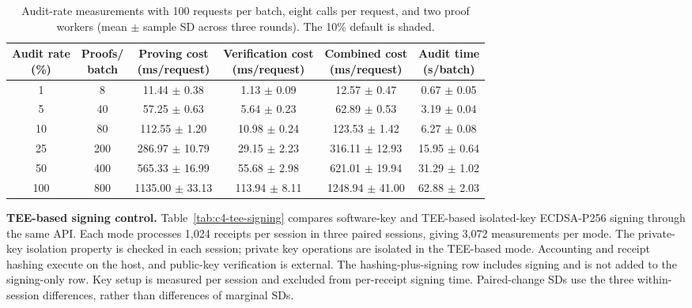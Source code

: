 \begin{table}[!t]
\centering
\caption{Audit-rate measurements with 100 requests per batch, eight calls per request, and two proof workers (mean $\pm$ sample SD across three rounds). The 10\% default is shaded.}
\label{tab:c3-audit-rate}
\footnotesize
\renewcommand{\arraystretch}{1.08}
\begin{tabular*}{\textwidth}{@{\hspace{3pt}}c@{\extracolsep{\fill}}ccccc@{\hspace{3pt}}}
\toprule
\shortstack{\textbf{Audit rate}\\\textbf{(\%)}} & \shortstack{\textbf{Proofs/}\\\textbf{batch}} & \shortstack{\textbf{Proving cost}\\\textbf{(ms/request)}} & \shortstack{\textbf{Verification cost}\\\textbf{(ms/request)}} & \shortstack{\textbf{Combined cost}\\\textbf{(ms/request)}} & \shortstack{\textbf{Audit time}\\\textbf{(s/batch)}} \\
\midrule
1 & 8 & 11.44 $\pm$ 0.38 & 1.13 $\pm$ 0.09 & 12.57 $\pm$ 0.47 & 0.67 $\pm$ 0.05 \\
5 & 40 & 57.25 $\pm$ 0.63 & 5.64 $\pm$ 0.23 & 62.89 $\pm$ 0.53 & 3.19 $\pm$ 0.04 \\
\rowcolor{gray!12}
10 & 80 & 112.55 $\pm$ 1.20 & 10.98 $\pm$ 0.24 & 123.53 $\pm$ 1.42 & 6.27 $\pm$ 0.08 \\
25 & 200 & 286.97 $\pm$ 10.79 & 29.15 $\pm$ 2.23 & 316.11 $\pm$ 12.93 & 15.95 $\pm$ 0.64 \\
50 & 400 & 565.33 $\pm$ 16.99 & 55.68 $\pm$ 2.98 & 621.01 $\pm$ 19.94 & 31.29 $\pm$ 1.02 \\
100 & 800 & 1135.00 $\pm$ 33.13 & 113.94 $\pm$ 8.11 & 1248.94 $\pm$ 41.00 & 62.88 $\pm$ 2.03 \\
\bottomrule
\end{tabular*}
\end{table}

\noindent\textbf{TEE-based signing control.}
Table~\ref{tab:c4-tee-signing} compares software-key and TEE-based isolated-key
ECDSA-P256 signing through the same API. Each mode processes 1,024 receipts
per session in three paired sessions, giving 3,072 measurements per mode.
The private-key isolation property is checked in each session; private
key operations are isolated in the TEE-based mode. Accounting and receipt
hashing execute on the host, and public-key verification is external.
The hashing-plus-signing row includes signing and is not added to the
signing-only row. Key setup is measured per session and excluded from
per-receipt signing time. Paired-change SDs use the three within-session
differences, rather than differences of marginal SDs.

